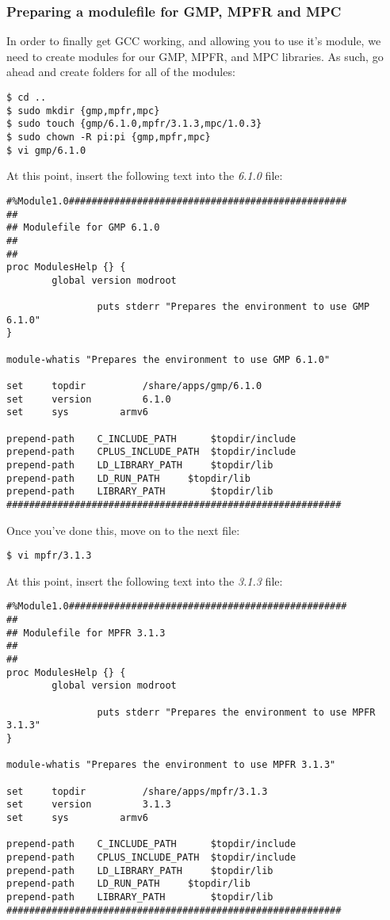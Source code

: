 \documentclass[]{article}
\begin{document}
\subsubsection{Preparing a modulefile for GMP, MPFR and MPC}
In order to finally get GCC working, and allowing you to use it's module, we need to create modules for our GMP, MPFR, and MPC
libraries. As such, go ahead and create folders for all of the modules:
\begin{lstlisting}
$ cd ..
$ sudo mkdir {gmp,mpfr,mpc}
$ sudo touch {gmp/6.1.0,mpfr/3.1.3,mpc/1.0.3}
$ sudo chown -R pi:pi {gmp,mpfr,mpc}
$ vi gmp/6.1.0
\end{lstlisting}
At this point, insert the following text into the \textit{6.1.0} file:
\begin{lstlisting}
#%Module1.0#################################################
##
## Modulefile for GMP 6.1.0
##
##
proc ModulesHelp {} {
        global version modroot
                
                puts stderr "Prepares the environment to use GMP 6.1.0"
}

module-whatis "Prepares the environment to use GMP 6.1.0"

set     topdir          /share/apps/gmp/6.1.0
set     version         6.1.0
set     sys         armv6

prepend-path    C_INCLUDE_PATH      $topdir/include
prepend-path    CPLUS_INCLUDE_PATH  $topdir/include
prepend-path    LD_LIBRARY_PATH     $topdir/lib
prepend-path    LD_RUN_PATH     $topdir/lib
prepend-path    LIBRARY_PATH        $topdir/lib
###########################################################
\end{lstlisting}
Once you've done this, move on to the next file:
\begin{lstlisting}
$ vi mpfr/3.1.3
\end{lstlisting}
At this point, insert the following text into the \textit{3.1.3} file:
\begin{lstlisting}
#%Module1.0#################################################
##
## Modulefile for MPFR 3.1.3
##
##
proc ModulesHelp {} {
        global version modroot
                
                puts stderr "Prepares the environment to use MPFR 3.1.3"
}

module-whatis "Prepares the environment to use MPFR 3.1.3"

set     topdir          /share/apps/mpfr/3.1.3
set     version         3.1.3
set     sys         armv6

prepend-path    C_INCLUDE_PATH      $topdir/include
prepend-path    CPLUS_INCLUDE_PATH  $topdir/include
prepend-path    LD_LIBRARY_PATH     $topdir/lib
prepend-path    LD_RUN_PATH     $topdir/lib
prepend-path    LIBRARY_PATH        $topdir/lib
###########################################################
\end{lstlisting}
\end{document}

